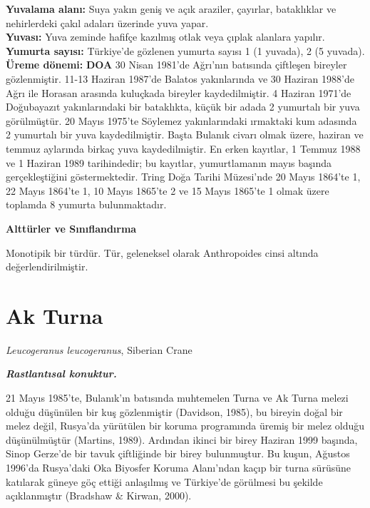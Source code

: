 \documentclass[
  a4paper,
  DIV=11,
  numbers=noendperiod]{scrreprt}
\begin{document}
\textbf{Yuvalama alanı:} Suya yakın geniş ve açık araziler, çayırlar,
bataklıklar ve nehirlerdeki çakıl adaları üzerinde yuva yapar.\\
\textbf{Yuvası:} Yuva zeminde hafifçe kazılmış otlak veya çıplak
alanlara yapılır.\\
\textbf{Yumurta sayısı:} Türkiye'de gözlenen yumurta sayısı 1 (1
yuvada), 2 (5 yuvada).\\
\textbf{Üreme dönemi:} \textbf{DOA} 30 Nisan 1981'de Ağrı'nın batısında
çiftleşen bireyler gözlenmiştir. 11-13 Haziran 1987'de Balatos
yakınlarında ve 30 Haziran 1988'de Ağrı ile Horasan arasında kuluçkada
bireyler kaydedilmiştir. 4 Haziran 1971'de Doğubayazıt yakınlarındaki
bir bataklıkta, küçük bir adada 2 yumurtalı bir yuva görülmüştür. 20
Mayıs 1975'te Söylemez yakınlarındaki ırmaktaki kum adasında 2 yumurtalı
bir yuva kaydedilmiştir. Başta Bulanık civarı olmak üzere, haziran ve
temmuz aylarında birkaç yuva kaydedilmiştir. En erken kayıtlar, 1 Temmuz
1988 ve 1 Haziran 1989 tarihindedir; bu kayıtlar, yumurtlamanın mayıs
başında gerçekleştiğini göstermektedir. Tring Doğa Tarihi Müzesi'nde 20
Mayıs 1864'te 1, 22 Mayıs 1864'te 1, 10 Mayıs 1865'te 2 ve 15 Mayıs
1865'te 1 olmak üzere toplamda 8 yumurta bulunmaktadır.

\textbf{Alttürler ve Sınıflandırma}

Monotipik bir türdür. Tür, geleneksel olarak Anthropoides cinsi altında
değerlendirilmiştir.

\section{Ak Turna}\label{ak-turna}

\emph{Leucogeranus leucogeranus}, Siberian Crane

\textbf{\emph{Rastlantısal konuktur.}}

21 Mayıs 1985'te, Bulanık'ın batısında muhtemelen Turna ve Ak Turna
melezi olduğu düşünülen bir kuş gözlenmiştir (Davidson, 1985), bu
bireyin doğal bir melez değil, Rusya'da yürütülen bir koruma programında
üremiş bir melez olduğu düşünülmüştür (Martins, 1989). Ardından ikinci
bir birey Haziran 1999 başında, Sinop Gerze'de bir tavuk çiftliğinde bir
birey bulunmuştur. Bu kuşun, Ağustos 1996'da Rusya'daki Oka Biyosfer
Koruma Alanı'ndan kaçıp bir turna sürüsüne katılarak güneye göç ettiği
anlaşılmış ve Türkiye'de görülmesi bu şekilde açıklanmıştır (Bradshaw \&
Kirwan, 2000).
\end{document}
